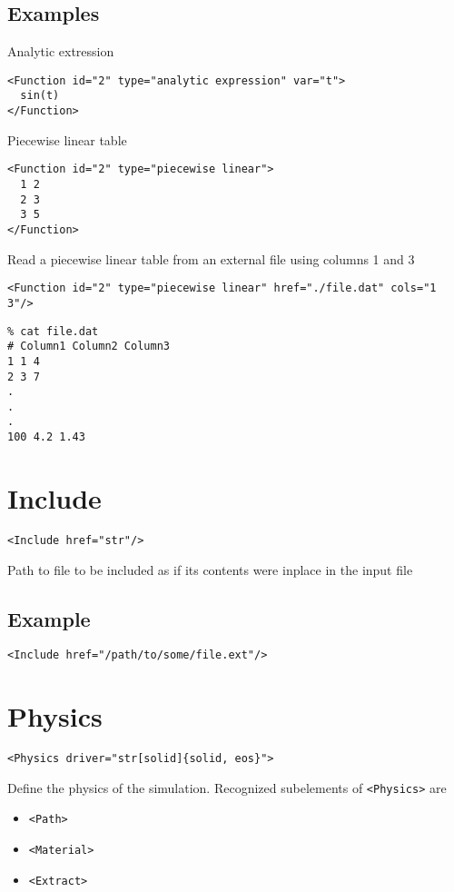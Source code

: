 \documentclass[11pt]{report}
\newcommand{\tag}[1]{\texttt{<#1>}}
\begin{document}
\subsection{Examples}
Analytic extression
%
\begin{verbatim}
<Function id="2" type="analytic expression" var="t">
  sin(t)
</Function>
\end{verbatim}

Piecewise linear table
%
\begin{verbatim}
<Function id="2" type="piecewise linear">
  1 2
  2 3
  3 5
</Function>
\end{verbatim}

Read a piecewise linear table from an external file using columns 1 and 3
%
\begin{verbatim}
<Function id="2" type="piecewise linear" href="./file.dat" cols="1 3"/>
\end{verbatim}

\begin{verbatim}
% cat file.dat
# Column1 Column2 Column3
1 1 4
2 3 7
.
.
.
100 4.2 1.43
\end{verbatim}

\section{Include}
\begin{verbatim}
<Include href="str"/>
\end{verbatim}
%
Path to file to be included as if its contents were inplace in the input file

\subsection{Example}
\begin{verbatim}
<Include href="/path/to/some/file.ext"/>
\end{verbatim}

\section{Physics}
\begin{verbatim}
<Physics driver="str[solid]{solid, eos}">
\end{verbatim}
%
Define the physics of the simulation. Recognized subelements of \tag{Physics}
are
%
\begin{itemize}
  \item \tag{Path}
  \item \tag{Material}
  \item \tag{Extract}
\end{itemize}
\end{document}
